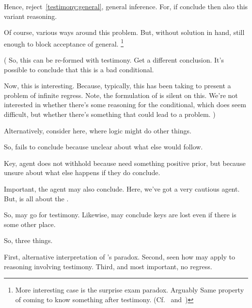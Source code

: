 \begin{note}
  Hence, reject~\ref{testimony:general}, general inference.
  For, if conclude then also this variant reasoning.

  Of course, various ways around this problem.
  But, without solution in hand, still enough to block acceptance of general.%
  \footnote{
    More interesting case is the surprise exam paradox.
    Arguably Same property of coming to know something after testimony.
    (Cf.~\textcite{Chow:1998vw} and~\textcite{Gerbrandy:2007vm})
  }


  (
  So, this can be re-formed with testimony.
  Get a different conclusion.
  It's possible to conclude that this is a bad conditional.

  Now, this is interesting.
  Because, typically, this has been taking to present a problem of infinite regress.
  Note, the formulation of \requ{} is silent on this.
  We're not interested in whether there's some reasoning for the conditional, which does seem difficult, but whether there's something that could lead to a problem.
  )

  Alternatively, consider \citeauthor{Harman:1986ux} here, where logic might do other things.
\end{note}


\begin{note}
  So, fails to conclude because unclear about what else would follow.

  Key, agent does not withhold because need something positive prior, but because unsure about what else happens if they do conclude.
\end{note}

\begin{note}
  Important, the agent may also conclude.
  Here, we've got a very cautious agent.
  But, \requ{} is all about the \agpe{}.

  So, may go for testimony.
  Likewise, may conclude keys are lost even if there is some other place.

  So, three things.

  First, alternative interpretation of \citeauthor{Carroll:1895uj}'s paradox.
  Second, seen how \requ{} may apply to reasoning involving testimony.
  Third, and most important, no regress.
\end{note}


